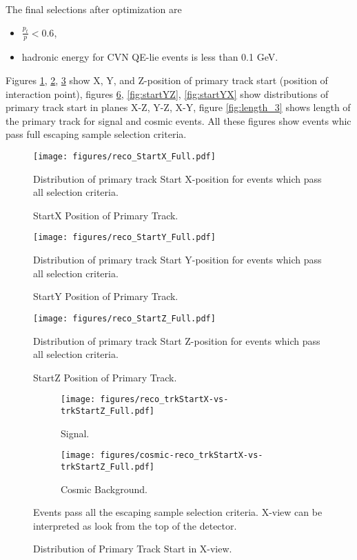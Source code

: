 The final selections after optimization are
\begin{itemize}
\item $\frac{p_t}{p} < 0.6$,
\item hadronic energy for CVN QE-lie events is less than 0.1 GeV.
\end{itemize}
Figures \ref{fig:startx}, \ref{fig:starty}, \ref{fig:startz} show X, Y, and Z-position of primary track start 
(position of interaction point), figures \ref{fig:startXZ}, \ref{fig:startYZ}, \ref{fig:startYX}  show distributions 
of primary track start in planes X-Z, Y-Z, X-Y, figure \ref{fig:length_3} shows length of the primary track for 
signal and cosmic events. All these figures show events whic pass full escaping sample selection criteria. 

\begin{figure}[!th]
\centering
\texttt{[image: figures/reco\_StartX\_Full.pdf]}
\caption{StartX Position of Primary Track.}
{Distribution of primary track Start X-position for events which pass all selection criteria.  }
\label{fig:startx}
\end{figure}

\begin{figure}[!th]
\centering
\texttt{[image: figures/reco\_StartY\_Full.pdf]}
\caption{StartY Position of Primary Track.}
{Distribution of primary track Start Y-position for events which pass all selection criteria.  }
\label{fig:starty}
\end{figure}

\begin{figure}[!th]
\centering
\texttt{[image: figures/reco\_StartZ\_Full.pdf]}
\caption{StartZ Position of Primary Track.}
{Distribution of primary track Start Z-position for events which pass all selection criteria.  }
\label{fig:startz}
\end{figure}

\begin{figure}[!th]
\centering
\begin{subfigure}[t]{0.95\textwidth}
  \centering
  \texttt{[image: figures/reco\_trkStartX-vs-trkStartZ\_Full.pdf]}
  \caption{Signal.}
  \label{fig:startXZ_sig}
\end{subfigure}
\vspace{0.5cm}
\newline
\begin{subfigure}[t]{0.95\textwidth}
  \centering
  \texttt{[image: figures/cosmic-reco\_trkStartX-vs-trkStartZ\_Full.pdf]}
  \caption{Cosmic Background.}
  \label{fig:startXZ_bkg}
\end{subfigure}
\caption{ Distribution of Primary Track Start in X-view.}
{ Events pass all the escaping sample selection criteria. X-view can be interpreted as look from the top of the detector. }
\label{fig:startXZ}
\end{figure}

